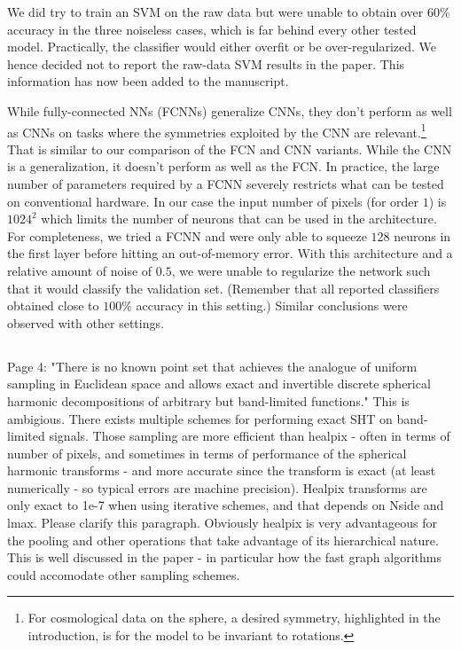 \documentclass[12pt,a4paper]{article}
\newcommand{\nati}[1]{{\color[rgb]{.1,.6,.1}{NP: #1}}}
\newcommand{\1}{\b{1}}              %
\newcommand{\0}{\b{0}}              %
\begin{document}
We did try to train an SVM on the raw data but were unable to obtain over $60\%$ accuracy in the three noiseless cases, which is far behind every other tested model.
Practically, the classifier would either overfit or be over-regularized.
We hence decided not to report the raw-data SVM results in the paper.
This information has now been added to the manuscript.

While fully-connected NNs (FCNNs) generalize CNNs, they don't perform as well as CNNs on tasks where the symmetries exploited by the CNN are relevant.\footnote{For cosmological data on the sphere, a desired symmetry, highlighted in the introduction, is for the model to be invariant to rotations.}
That is similar to our comparison of the FCN and CNN variants.
While the CNN is a generalization, it doesn't perform as well as the FCN.
In practice, the large number of parameters required by a FCNN severely restricts what can be tested on conventional hardware. In our case the input number of pixels (for order $1$) is $1024^2$ which limits the number of neurons that can be used in the architecture. For completeness, we tried a FCNN and were only able to squeeze $128$ neurons in the first layer before hitting an out-of-memory error. With this architecture and a relative amount of noise of $0.5$, we were unable to regularize the network such that it would classify the validation set. (Remember that all reported classifiers obtained close to $100\%$ accuracy in this setting.) Similar conclusions were observed with other settings.


\subsection{}
\begin{mdframed}[style=comment]
Page 4: "There is no known point set that achieves the analogue of uniform sampling in Euclidean space and allows exact and invertible discrete spherical harmonic decompositions of arbitrary but band-limited functions." This is ambigious. There exists multiple schemes for performing exact SHT on band-limited signals. Those sampling are more efficient than healpix - often in terms of number of pixels, and sometimes in terms of performance of the spherical harmonic transforms - and more accurate since the transform is exact (at least numerically - so typical errors are machine precision). Healpix transforms are only exact to 1e-7 when using iterative schemes, and that depends on Nside and lmax. Please clarify this paragraph. Obviously healpix is very advantageous for the pooling and other operations that take advantage of its hierarchical nature. This is well discussed in the paper - in particular how the fast graph algorithms could accomodate other sampling schemes.
\end{mdframed}
\end{document}

